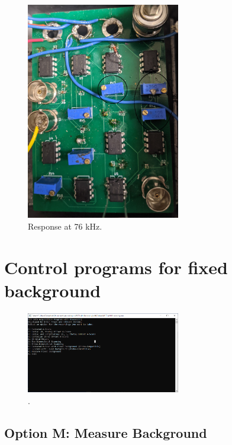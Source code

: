 \documentclass{article}
\begin{document}
\begin{figure}[!h]
	\centering
	\includegraphics[width=0.6\textwidth]{Data for Probe Writeup/circuit.jpg}
	\caption{Response at 76 kHz.}
\end{figure}

\section{Control programs for fixed background}\label{controlprograms}
\hypertarget{controlprograms}{}

\par{}

\begin{figure}[!h]
	\centering
	\includegraphics[width=0.6\textwidth]{Data for Probe Writeup/Terminal at Startup.png}
	\caption{.}
\end{figure}

\subsection{Option M: Measure Background}
\end{document}
